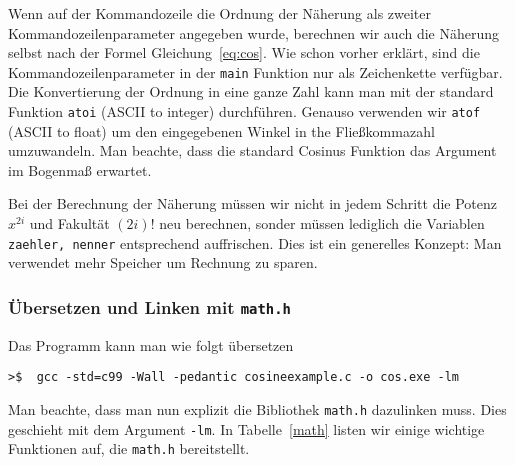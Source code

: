 Wenn auf der Kommandozeile die Ordnung der Näherung als zweiter Kommandozeilenparameter angegeben wurde, berechnen wir auch die Näherung selbst nach der Formel Gleichung~\ref{eq:cos}.
Wie schon vorher erklärt, sind die Kommandozeilenparameter in der \texttt{main} Funktion nur als Zeichenkette verfügbar.
Die Konvertierung der Ordnung in eine ganze Zahl kann man mit der standard Funktion \texttt{atoi} (ASCII to integer) durchführen.
Genauso verwenden wir \texttt{atof} (ASCII to float) um den eingegebenen Winkel in the Fließkommazahl umzuwandeln.
Man beachte, dass die standard Cosinus Funktion das Argument im Bogenmaß erwartet.

Bei der Berechnung der Näherung müssen wir nicht in jedem Schritt die Potenz $x^{2i}$ und Fakultät $(2i)!$ neu berechnen, sonder müssen lediglich die Variablen \texttt{zaehler, nenner} entsprechend auffrischen.
Dies ist ein generelles Konzept: Man verwendet mehr Speicher um Rechnung zu sparen.

\subsubsection{Übersetzen und Linken mit \texttt{math.h}}

Das Programm kann man wie folgt übersetzen

\vspace*{0.5cm}
\begin{verbatim}
>$  gcc -std=c99 -Wall -pedantic cosineexample.c -o cos.exe -lm
\end{verbatim}
\vspace*{0.5cm}

\noindent Man beachte, dass man nun explizit die Bibliothek \texttt{math.h} dazulinken muss.
Dies geschieht mit dem Argument \texttt{-lm}.
In Tabelle~\ref{math} listen wir einige wichtige Funktionen auf, die \texttt{math.h} bereitstellt.

